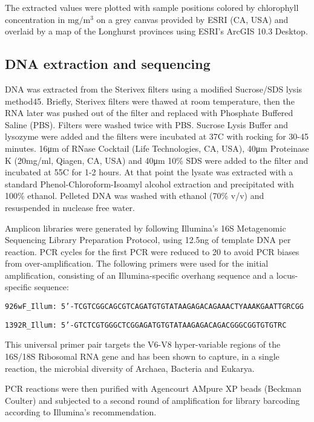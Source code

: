 The extracted values were plotted with sample positions colored by chlorophyll concentration in $\textrm{mg}/\textrm{m}^3$ on a grey canvas provided by ESRI (CA, USA) and overlaid by a map of the Longhurst provinces \cite{longhurst_estimate_1995, marineregions} using ESRI's ArcGIS 10.3 Desktop.

\subsection{DNA extraction and sequencing}

DNA was extracted from the Sterivex filters using a modified Sucrose/SDS lysis method45. Briefly, Sterivex filters were thawed at room temperature, then the RNA later was pushed out of the filter and replaced with Phosphate Buffered Saline (PBS). Filters were washed twice with PBS. Sucrose Lysis Buffer \cite{massana_vertical_1997} and lysozyme were added and the filters were incubated at 37\degree C with rocking for 30-45 minutes. 16\si{\micro\meter} of RNase Cocktail (Life Technologies, CA, USA), 40\si{\micro\meter} Proteinase K (20mg/ml, Qiagen, CA, USA) and 40\si{\micro\meter} 10\% SDS were added to the filter and incubated at 55\degree C for 1-2 hours. At that point the lysate was extracted with a standard Phenol-Chloroform-Isoamyl alcohol extraction and precipitated with 100\% ethanol. Pelleted DNA was washed with ethanol (70\% v/v) and resuspended in nuclease free water.

Amplicon libraries were generated by following Illumina's 16S Metagenomic Sequencing Library Preparation Protocol, using 12.5ng of template DNA per reaction. PCR cycles for the first PCR were reduced to 20 to avoid PCR biases from over-amplification. The following primers were used for the initial amplification, consisting of an Illumina-specific overhang sequence and a locus-specific sequence:

{\tt 926wF\_Illum: 5'-TCGTCGGCAGCGTCAGATGTGTATAAGAGACAGAAACTYAAAKGAATTGRCGG}

{\tt 1392R\_Illum: 5'-GTCTCGTGGGCTCGGAGATGTGTATAAGAGACAGACGGGCGGTGTGTRC}

\noindent This universal primer pair targets the V6-V8 hyper-variable regions of the 16S/18S Ribosomal RNA gene and has been shown to capture, in a single reaction, the microbial diversity of Archaea, Bacteria and Eukarya. \cite{wilkins_advection_2013}

PCR reactions were then purified with Agencourt AMpure XP beads (Beckman Coulter) and subjected to a second round of amplification for library barcoding according to Illumina's recommendation.

